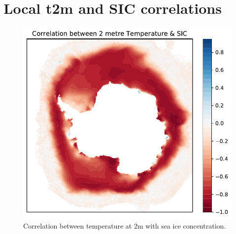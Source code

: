 \section{Local t2m and SIC correlations}
\begin{figure}[H]
    \centering
    \includegraphics{Images/tempcorrwithsic.pdf}
    \caption{Correlation between temperature at 2m with sea ice concentration.}
    \label{fig:results:2mtemp_corr_with_sic}
\end{figure}
